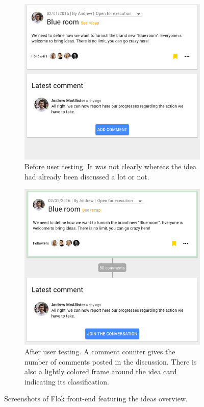 \documentclass[a4paper,12pt, oneside]{article}
\begin{document}
\begin{figure}[!htb]
    \begin{subfigure}[t]{.5\textwidth}
        \includegraphics[width=\textwidth]{images/user_tests/ideaView_before.png}
        \caption{Before user testing. It was not clearly whereas the idea had already been discussed a lot or not.}
        \label{fig.tests.ideaView.before}
    \end{subfigure}
    \begin{subfigure}[t]{.5\textwidth}
        \includegraphics[width=\textwidth]{images/user_tests/ideaView_after.png}
        \caption{After user testing. A comment counter gives the number of comments posted in the discussion. There is also a lightly colored frame around the idea card indicating its classification.}
        \label{fig.tests.ideaView.after}
    \end{subfigure}
    \caption{Screenshots of Flok front-end featuring the ideas overview.}
    \label{fig.tests.ideaView}
\end{figure}
\end{document}

